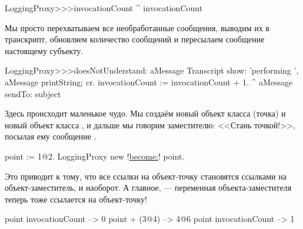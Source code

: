 \documentclass[a4paper,10pt,twoside]{book}
\begin{document}
{\begin{code}{}
LoggingProxy>>>invocationCount
	^ invocationCount
\end{code}

Мы просто перехватываем все необработанные сообщения, выводим их в транскрипт, обновляем количество сообщений и пересылаем сообщение настоящему субъекту.
\begin{code}{}
LoggingProxy>>>doesNotUnderstand: aMessage 
	Transcript show: 'performing ', aMessage printString; cr.
	invocationCount := invocationCount + 1.
	^ aMessage sendTo: subject
\end{code}

Здесь происходит маленькое чудо.
Мы создаём новый объект класса  (точка) и новый объект класса , и дальше мы говорим заместителю: <<Стань точкой!>>, посылая ему сообщение .
\begin{code}{}
point := 1@2.
LoggingProxy new !\underline{become:}! point.
\end{code}

Это приводит к тому, что все ссылки на объект-точку становятся ссылками на объект-заместитель, и наоборот. А главное, --- переменная  объекта-заместителя теперь тоже ссылается на объект-точку!

\begin{code}{}
point invocationCount --> 0
point + (3@4)             --> 4@6
point invocationCount --> 1
\end{code}

}
\end{document}
